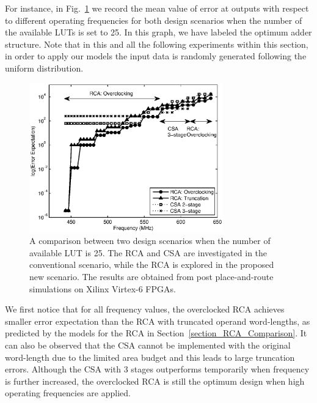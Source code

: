 \documentclass[prodmode,acmtrets]{acmsmall} %
\begin{document}
For instance, in Fig.~\ref{Fig_CSA_LUT25} we record the mean value of error at outputs with respect to different operating frequencies for both design scenarios when the number of the available LUTs is set to 25. In this graph, we have labeled the optimum adder structure. Note that in this and all the following experiments within this section, in order to apply our models the input data is randomly generated following the uniform distribution.
%
\begin{figure}[t]
  \centering
  \includegraphics[width=3.3in]{./Figures/Error_LUT25.eps}
  \caption{A comparison between two design scenarios when the number of available LUT is 25. The RCA and CSA are investigated in the conventional scenario, while the RCA is explored in the proposed new scenario. The results are obtained from post place-and-route simulations on Xilinx Virtex-6 FPGAs.}
  \vspace{-.5ex}
  \label{Fig_CSA_LUT25}
\end{figure}

We first notice that for all frequency values, the overclocked RCA achieves smaller error expectation than the RCA with truncated operand word-lengths, as predicted by the models for the RCA in Section~\ref{section_RCA_Comparison}. It can also be observed that the CSA cannot be implemented with the original word-length due to the limited area budget and this leads to large truncation errors. Although the CSA with 3 stages outperforms temporarily when frequency is further increased, the overclocked RCA is still the optimum design when high operating frequencies are applied.
\end{document}
